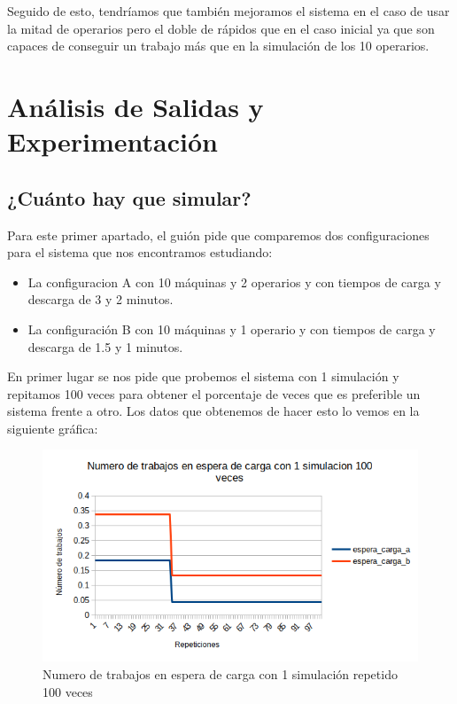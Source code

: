 \documentclass[11pt,a4paper]{report}
\begin{document}
Seguido de esto, tendríamos que también mejoramos el sistema en el caso de usar la mitad de operarios pero el doble de rápidos que en el caso inicial ya que son capaces de conseguir un trabajo más que en la simulación de los 10 operarios. 

\chapter{Análisis de Salidas y Experimentación}

\newpage

\section{¿Cuánto hay que simular?}

Para este primer apartado, el guión pide que comparemos dos configuraciones para el sistema que nos encontramos estudiando:

\begin{itemize}
	\item{La configuracion A con 10 máquinas y 2 operarios y con tiempos de carga y descarga de 3 y 2 minutos.}
	\item{La configuración B con 10 máquinas y 1 operario y con tiempos de carga y descarga de 1.5 y 1 minutos.}
\end{itemize}

En primer lugar se nos pide que probemos el sistema con 1 simulación y repitamos 100 veces para obtener el porcentaje de veces que es preferible un sistema frente a otro. Los datos que obtenemos de hacer esto lo vemos en la siguiente gráfica:

\begin{figure}[H]
\centering
\includegraphics[width=\textwidth]{img/cap-3/espera_carga_1-5-1.png}
\caption{Numero de trabajos en espera de carga con 1 simulación repetido 100 veces}
\end{figure}
\end{document}
